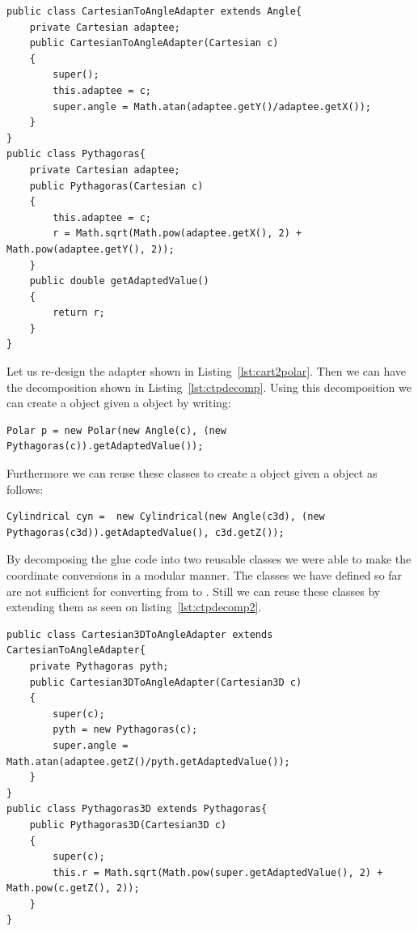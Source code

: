 \begin{lstlisting}[float, caption={Decomposition of the members of the polar coordinate}, label={lst:ctpdecomp}]
public class CartesianToAngleAdapter extends Angle{
	private Cartesian adaptee;
	public CartesianToAngleAdapter(Cartesian c)
	{
		super();
		this.adaptee = c;
		super.angle = Math.atan(adaptee.getY()/adaptee.getX());
	}	
}
public class Pythagoras{
	private Cartesian adaptee;
	public Pythagoras(Cartesian c)
	{
		this.adaptee = c;
		r = Math.sqrt(Math.pow(adaptee.getX(), 2) + Math.pow(adaptee.getY(), 2));
	}
	public double getAdaptedValue()
	{
		return r;
	}	
}
\end{lstlisting}

Let us re-design the adapter shown in Listing~\ref{lst:cart2polar}. Then we can have the decomposition shown in Listing~\ref{lst:ctpdecomp}. Using this decomposition we can create a  object given a  object  by writing:
\begin{lstlisting}
Polar p = new Polar(new Angle(c), (new Pythagoras(c)).getAdaptedValue());
\end{lstlisting}

Furthermore we can reuse these classes to create a  object given a  object  as follows:
\begin{lstlisting}
Cylindrical cyn =  new Cylindrical(new Angle(c3d), (new Pythagoras(c3d)).getAdaptedValue(), c3d.getZ());
\end{lstlisting}

By decomposing the glue code into two reusable classes we were able to make the coordinate conversions in a modular manner. The classes we have defined so far are not sufficient for converting from  to . Still we can reuse these classes by extending them as seen on listing~\ref{lst:ctpdecomp2}.

\begin{lstlisting}[float, caption={Extended versions of conversion classes}, label={lst:ctpdecomp2}]
public class Cartesian3DToAngleAdapter extends CartesianToAngleAdapter{
	private Pythagoras pyth;
	public Cartesian3DToAngleAdapter(Cartesian3D c)
	{
		super(c);
		pyth = new Pythagoras(c);
		super.angle = Math.atan(adaptee.getZ()/pyth.getAdaptedValue());
	}	
}
public class Pythagoras3D extends Pythagoras{
	public Pythagoras3D(Cartesian3D c)
	{
		super(c);
		this.r = Math.sqrt(Math.pow(super.getAdaptedValue(), 2) + Math.pow(c.getZ(), 2));
	}	
}
\end{lstlisting}


